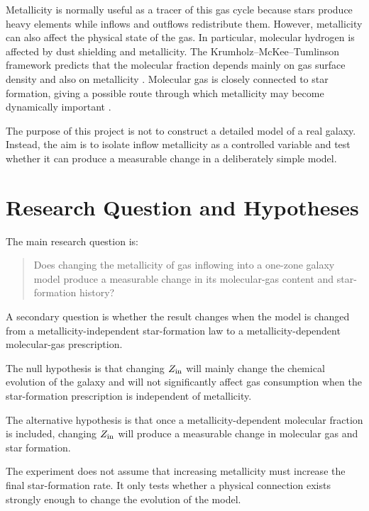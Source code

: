 \documentclass[10pt,a4paper]{article}
\begin{document}
Metallicity is normally useful as a tracer of this gas cycle because stars produce heavy elements while inflows and outflows redistribute them. However, metallicity can also affect the physical state of the gas. In particular, molecular hydrogen is affected by dust shielding and metallicity. The Krumholz--McKee--Tumlinson framework predicts that the molecular fraction depends mainly on gas surface density and also on metallicity \cite{kmt2008,kmt2009ii}. Molecular gas is closely connected to star formation, giving a possible route through which metallicity may become dynamically important \cite{kmt2009sf}.

The purpose of this project is not to construct a detailed model of a real galaxy. Instead, the aim is to isolate inflow metallicity as a controlled variable and test whether it can produce a measurable change in a deliberately simple model.

\section{Research Question and Hypotheses}

The main research question is:

\begin{quote}
Does changing the metallicity of gas inflowing into a one-zone galaxy model produce a measurable change in its molecular-gas content and star-formation history?
\end{quote}

A secondary question is whether the result changes when the model is changed from a metallicity-independent star-formation law to a metallicity-dependent molecular-gas prescription.

The null hypothesis is that changing \(Z_{\rm in}\) will mainly change the chemical evolution of the galaxy and will not significantly affect gas consumption when the star-formation prescription is independent of metallicity.

The alternative hypothesis is that once a metallicity-dependent molecular fraction is included, changing \(Z_{\rm in}\) will produce a measurable change in molecular gas and star formation.

The experiment does not assume that increasing metallicity must increase the final star-formation rate. It only tests whether a physical connection exists strongly enough to change the evolution of the model.
\end{document}
